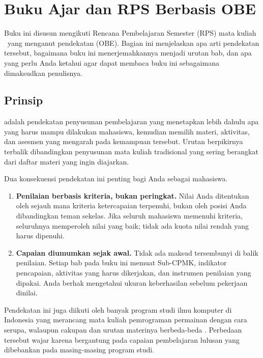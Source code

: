\section{Buku Ajar dan RPS Berbasis OBE}
\label{sec:obe}

Buku ini disusun mengikuti Rencana Pembelajaran Semester (RPS) mata kuliah
\NamaMK\ yang menganut pendekatan  (OBE).
Bagian ini menjelaskan apa arti pendekatan tersebut, bagaimana buku ini
menerjemahkannya menjadi urutan bab, dan apa yang perlu Anda ketahui agar
dapat membaca buku ini sebagaimana dimaksudkan penulisnya.

\subsection{Prinsip }

 adalah pendekatan penyusunan pembelajaran
yang menetapkan lebih dahulu apa yang harus mampu dilakukan mahasiswa,
kemudian memilih materi, aktivitas, dan asesmen yang mengarah pada kemampuan
tersebut. Urutan berpikirnya terbalik dibandingkan penyusunan mata kuliah
tradisional yang sering berangkat dari daftar materi yang ingin diajarkan.

Dua konsekuensi pendekatan ini penting bagi Anda sebagai mahasiswa.

\begin{enumerate}
  \item \textbf{Penilaian berbasis kriteria, bukan peringkat.} Nilai Anda
        ditentukan oleh sejauh mana kriteria ketercapaian terpenuhi, bukan
        oleh posisi Anda dibandingkan teman sekelas. Jika seluruh mahasiswa
        memenuhi kriteria, seluruhnya memperoleh nilai yang baik; tidak ada
        kuota nilai rendah yang harus dipenuhi.
  \item \textbf{Capaian diumumkan sejak awal.} Tidak ada maksud tersembunyi di
        balik penilaian. Setiap bab pada buku ini memuat Sub-CPMK, indikator
        pencapaian, aktivitas yang harus dikerjakan, dan instrumen penilaian
        yang dipakai. Anda berhak mengetahui ukuran keberhasilan sebelum
        pekerjaan dinilai.
\end{enumerate}

Pendekatan ini juga diikuti oleh banyak program studi ilmu komputer di
Indonesia yang merancang mata kuliah pemrograman permainan dengan cara
serupa, walaupun cakupan dan urutan materinya berbeda-beda
\cite{its-rps-game,unima-rps-game,polibatam-kurikulum}. Perbedaan tersebut
wajar karena bergantung pada capaian pembelajaran lulusan yang dibebankan
pada masing-masing program studi.

